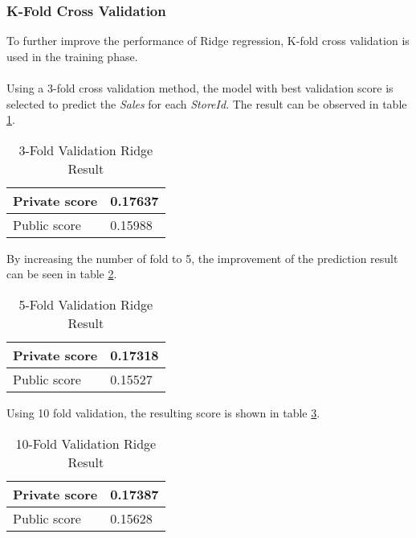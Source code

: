 \subsubsection{K-Fold Cross Validation}
To further improve the performance of Ridge regression, K-fold cross validation is used in the training phase. \\ \\
Using a 3-fold cross validation method, the model with best validation score is selected to predict the \textit{Sales} for each \textit{StoreId}. The result can be observed in table \ref{tab:ridge_3_fold}.
\begin{table}[H]
	\centering
	\caption{3-Fold Validation Ridge Result}
	\label{tab:ridge_3_fold}
	\begin{tabular}{|m{100pt}|m{50pt}|}
		\hline
		Private score & 0.17637 \\ \hline
		Public score  & 0.15988 \\ \hline
	\end{tabular}
\end{table}

\noindent
By increasing the number of fold to 5, the improvement of the prediction result can be seen in table \ref{tab:ridge_5_fold}.
\begin{table}[H]
	\centering
	\caption{5-Fold Validation Ridge Result}
	\label{tab:ridge_5_fold}
	\begin{tabular}{|m{100pt}|m{50pt}|}
		\hline
		Private score & 0.17318 \\ \hline
		Public score  & 0.15527 \\ \hline
	\end{tabular}
\end{table}

\noindent
Using 10 fold validation, the resulting score is shown in table \ref{tab:ridge_10_fold}.
\begin{table}[H]
	\centering
	\caption{10-Fold Validation Ridge Result}
	\label{tab:ridge_10_fold}
	\begin{tabular}{|m{100pt}|m{50pt}|}
		\hline
		Private score & 0.17387 \\ \hline
		Public score  & 0.15628 \\ \hline
	\end{tabular}
\end{table}

